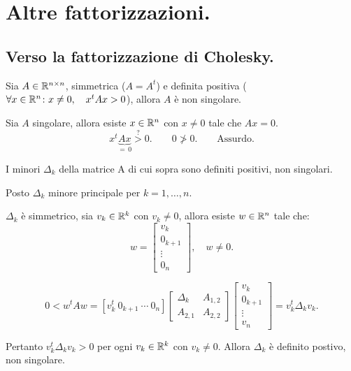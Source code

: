 
\chapter{Altre fattorizzazioni.}

\section{Verso la fattorizzazione di Cholesky.}

\begin{prop}
Sia $A \in \mathbb{R}^{n \times n}$, simmetrica ($A = A^t$) e definita positiva ($
\forall x \in \mathbb{R}^n \colon x \neq 0, \quad x^tAx > 0$), allora $A$ è non
singolare.
\end{prop}
\begin{dimo}
Sia $A$ singolare, allora esiste $x \in \mathbb{R}^n$ con $x \neq 0$ tale che
$Ax = 0$.
\[x^t\underbrace{Ax}_{= \, 0}\stackrel{?}{>} 0.\qquad
0 \ngtr 0. \qquad \textrm{Assurdo.}\]
\end{dimo}
\begin{prop}
I minori $\Delta_k$ della matrice A di cui sopra sono definiti positivi,
non singolari.
\end{prop}
\begin{dimo}
Posto $\Delta_k$ minore principale per $k = 1, \ldots, n$.
\begin{flushleft}
$\Delta_k$ è simmetrico, sia $v_k \in \mathbb{R}^k$ con $v_k \neq 0$, allora
esiste $w \in \mathbb{R}^n$ tale che:
\[w = \left[
\begin{array}{c}
v_k \\
0_{k+1} \\
\vdots \\
0_{n}
\end{array}\right], \quad w \neq 0.\]
\end{flushleft}
\[
0 < w^tAw = \left[v_k^t \ 0_{k+1} \ \cdots \ 0_n \right]
\left[
\begin{array}{c|c}
\Delta_k & A_{1,2} \\
\hline
A_{2,1} & A_{2,2}
\end{array}
\right]
\left[
\begin{array}{c}
v_k \\
0_{k+1} \\
\vdots \\
v_n
\end{array}
\right] = v_k^t\Delta_kv_k.
\]

Pertanto $v_k^t\Delta_kv_k > 0$ per ogni $v_k \in \mathbb{R}^k$ con $v_k \neq 0$.
Allora $\Delta_k$ è definito postivo, non singolare.
\end{dimo}

